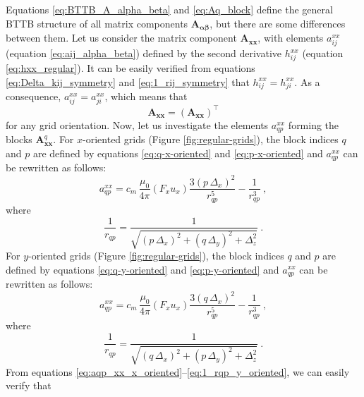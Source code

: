 \documentclass[manuscript]{geophysics}
\begin{document}
	Equations \ref{eq:BTTB_A_alpha_beta} and \ref{eq:Aq_block} define the general BTTB
	structure of all matrix components $\mathbf{A_{\boldsymbol{\alpha\beta}}}$, but 
	there are some differences between them.
	Let us consider the matrix component $\mathbf{A}_{\boldsymbol{xx}}$, with elements
	$a^{xx}_{ij}$ (equation \ref{eq:aij_alpha_beta}) defined by the second derivative
	$h^{xx}_{ij}$ (equation \ref{eq:hxx_regular}). It can be easily verified from equations
	\ref{eq:Delta_kij_symmetry} and \ref{eq:1_rij_symmetry} that $h^{xx}_{ij} = h^{xx}_{ji}$.
	As a consequence, $a^{xx}_{ij} = a^{xx}_{ji}$, which means that 
	\begin{equation}
		\mathbf{A}_{\boldsymbol{xx}} = \left( \mathbf{A}_{\boldsymbol{xx}} \right)^{\top}
		\label{eq:Axx_symmetry}
	\end{equation}
	for any grid orientation.
	Now, let us investigate the elements $a^{xx}_{qp}$ forming the blocks $\mathbf{A}_{\boldsymbol{xx}}^{q}$.
	For $x$-oriented grids (Figure \ref{fig:regular-grids}), the block indices $q$ and $p$ are defined 
	by equations \ref{eq:q-x-oriented} and 
	\ref{eq:p-x-oriented} and $a^{xx}_{qp}$ can be rewritten as follows:
	\begin{equation}
		a^{xx}_{qp} = c_{m} \, \frac{\mu_{0}}{4\pi} 
		\left( F_{x} u_{x} \right) \frac{3 \left( p \, \Delta_{x} \right)^{2}}{r_{qp}^{5}} - 
		\frac{1}{r_{qp}^{3}} \: ,
		\label{eq:aqp_xx_x_oriented}
	\end{equation}
	where
	\begin{equation}
		\frac{1}{r_{qp}} = 
		\frac{1}{\sqrt{\left( p \, \Delta_{x} \right)^{2} + \left( q \, \Delta_{y} \right)^{2} + \Delta_{z}^{2}}} \: .
		\label{eq:1_rqp_x_oriented}
	\end{equation}
	For $y$-oriented grids (Figure \ref{fig:regular-grids}), the block indices $q$ and $p$ are 
	defined by equations \ref{eq:q-y-oriented} and 
	\ref{eq:p-y-oriented} and $a^{xx}_{qp}$ can be rewritten as follows:
	\begin{equation}
		a^{xx}_{qp} = c_{m} \, \frac{\mu_{0}}{4\pi} 
		\left( F_{x} u_{x} \right) \frac{3 \left( q \, \Delta_{x} \right)^{2}}{r_{qp}^{5}} - 
		\frac{1}{r_{qp}^{3}} \: ,
		\label{eq:aqp_xx_y_oriented}
	\end{equation}
	where
	\begin{equation}
		\frac{1}{r_{qp}} = 
		\frac{1}{\sqrt{\left( q \, \Delta_{x} \right)^{2} + \left( p \, \Delta_{y} \right)^{2} + \Delta_{z}^{2}}} \: .
		\label{eq:1_rqp_y_oriented}
	\end{equation}
	From equations \ref{eq:aqp_xx_x_oriented}--\ref{eq:1_rqp_y_oriented}, we can easily verify that
\end{document}

